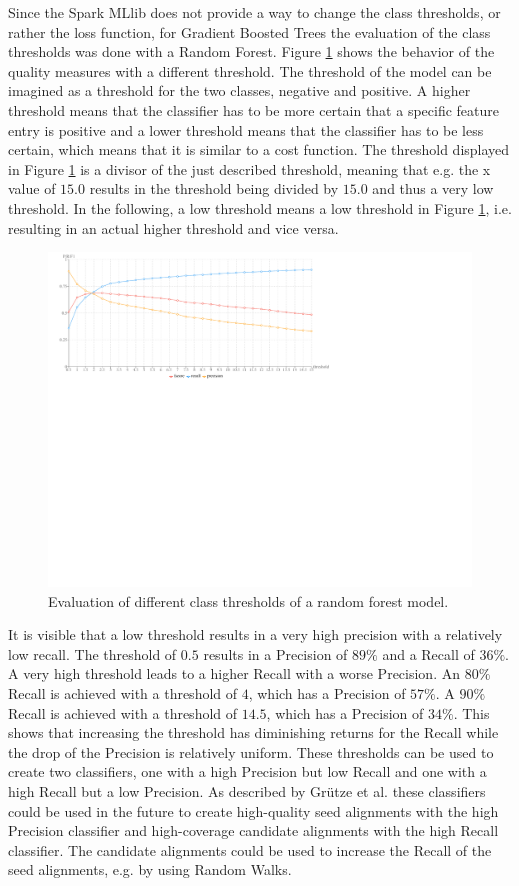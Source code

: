 Since the Spark MLlib does not provide a way to change the class thresholds, or rather the loss function, for Gradient Boosted Trees the evaluation of the class thresholds was done with a Random Forest. Figure \ref{rf_thresh_large} shows the behavior of the quality measures with a different threshold. The threshold of the model can be imagined as a threshold for the two classes, negative and positive. A higher threshold means that the classifier has to be more certain that a specific feature entry is positive and a lower threshold means that the classifier has to be less certain, which means that it is similar to a cost function. The threshold displayed in Figure \ref{rf_thresh_large} is a divisor of the just described threshold, meaning that e.g. the x value of $15.0$ results in the threshold being divided by $15.0$ and thus a very low threshold. In the following, a low threshold means a low threshold in Figure \ref{rf_thresh_large}, i.e. resulting in an actual higher threshold and vice versa.
\begin{figure}[H]
	\centering
	\includegraphics[width=\textwidth]{img/rf_thresh_large}
	\caption{Evaluation of different class thresholds of a random forest model.}
	\label{rf_thresh_large}
\end{figure}
It is visible that a low threshold results in a very high precision with a relatively low recall. The threshold of $0.5$ results in a Precision of $89\%$ and a Recall of $36\%$. A very high threshold leads to a higher Recall with a worse Precision. An $80\%$ Recall is achieved with a threshold of $4$, which has a Precision of $57\%$. A $90\%$ Recall is achieved with a threshold of $14.5$, which has a Precision of $34\%$. This shows that increasing the threshold has diminishing returns for the Recall while the drop of the Precision is relatively uniform. These thresholds can be used to create two classifiers, one with a high Precision but low Recall and one with a high Recall but a low Precision. As described by Grütze et al. \cite{coheel} these classifiers could be used in the future to create high-quality seed alignments with the high Precision classifier and high-coverage candidate alignments with the high Recall classifier. The candidate alignments could be used to increase the Recall of the seed alignments, e.g. by using Random Walks.


